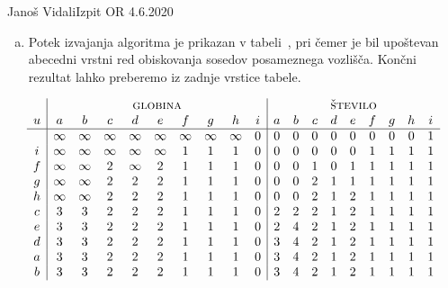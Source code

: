 \begin{naloga}{Janoš Vidali}{Izpit OR 4.6.2020}
\begin{odgovor}
\begin{enumerate}[(a)]
\item Potek izvajanja algoritma je prikazan v tabeli~\tab,
pri čemer je bil upoštevan abecedni vrstni red
obiskovanja sosedov posameznega vozlišča.
Končni rezultat lahko preberemo iz zadnje vrstice tabele.
\end{enumerate}
%
\begin{tabela}
$$
\begin{array}{c|ccccccccc|ccccccccc}
& \multicolumn{9}{c|}{\text{\sc globina}}
& \multicolumn{9}{c}{\text{\sc število}} \\
u & a & b & c & d & e & f & g & h & i & a & b & c & d & e & f & g & h & i \\
\hline
& \infty & \infty & \infty & \infty & \infty & \infty & \infty & \infty & 0
& 0 & 0 & 0 & 0 & 0 & 0 & 0 & 0 & 1 \\
i & \infty & \infty & \infty & \infty & \infty & 1 & 1 & 1 & 0
& 0 & 0 & 0 & 0 & 0 & 1 & 1 & 1 & 1 \\
f & \infty & \infty & 2 & \infty & 2 & 1 & 1 & 1 & 0
& 0 & 0 & 1 & 0 & 1 & 1 & 1 & 1 & 1 \\
g & \infty & \infty & 2 & 2 & 2 & 1 & 1 & 1 & 0
& 0 & 0 & 2 & 1 & 1 & 1 & 1 & 1 & 1 \\
h & \infty & \infty & 2 & 2 & 2 & 1 & 1 & 1 & 0
& 0 & 0 & 2 & 1 & 2 & 1 & 1 & 1 & 1 \\
c & 3 & 3 & 2 & 2 & 2 & 1 & 1 & 1 & 0
& 2 & 2 & 2 & 1 & 2 & 1 & 1 & 1 & 1 \\
e & 3 & 3 & 2 & 2 & 2 & 1 & 1 & 1 & 0
& 2 & 4 & 2 & 1 & 2 & 1 & 1 & 1 & 1 \\
d & 3 & 3 & 2 & 2 & 2 & 1 & 1 & 1 & 0
& 3 & 4 & 2 & 1 & 2 & 1 & 1 & 1 & 1 \\
a & 3 & 3 & 2 & 2 & 2 & 1 & 1 & 1 & 0
& 3 & 4 & 2 & 1 & 2 & 1 & 1 & 1 & 1 \\
b & 3 & 3 & 2 & 2 & 2 & 1 & 1 & 1 & 0
& 3 & 4 & 2 & 1 & 2 & 1 & 1 & 1 & 1
\end{array}
$$
\end{tabela}
\end{odgovor}
\end{naloga}
